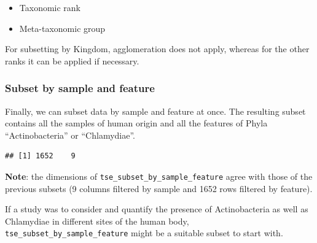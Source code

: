 \documentclass[
]{book}
\newenvironment{Shaded}{\begin{snugshade}}{\end{snugshade}}
\newcommand{\CommentTok}[1]{\textcolor[rgb]{0.56,0.35,0.01}{\textit{#1}}}
\newcommand{\FunctionTok}[1]{\textcolor[rgb]{0.00,0.00,0.00}{#1}}
\newcommand{\NormalTok}[1]{#1}
\newcommand{\OtherTok}[1]{\textcolor[rgb]{0.56,0.35,0.01}{#1}}
\newcommand{\SpecialCharTok}[1]{\textcolor[rgb]{0.00,0.00,0.00}{#1}}
\newcommand{\StringTok}[1]{\textcolor[rgb]{0.31,0.60,0.02}{#1}}
\providecommand{\tightlist}{%
  \setlength{\itemsep}{0pt}\setlength{\parskip}{0pt}}
\begin{document}
\begin{itemize}
\tightlist
\item
  Taxonomic rank
\item
  Meta-taxonomic group
\end{itemize}

For subsetting by Kingdom, agglomeration does not apply, whereas for
the other ranks it can be applied if necessary.

\hypertarget{subset-by-sample-and-feature}{%
\subsubsection{Subset by sample and feature}\label{subset-by-sample-and-feature}}

Finally, we can subset data by sample and feature at once. The
resulting subset contains all the samples of human origin and all the
features of Phyla ``Actinobacteria'' or ``Chlamydiae''.

\begin{Shaded}
\end{Shaded}

\begin{verbatim}
## [1] 1652    9
\end{verbatim}

\textbf{Note}: the dimensions of \texttt{tse\_subset\_by\_sample\_feature} agree with
those of the previous subsets (9 columns filtered by sample and 1652
rows filtered by feature).

If a study was to consider and quantify the presence of Actinobacteria
as well as Chlamydiae in different sites of the human body,
\texttt{tse\_subset\_by\_sample\_feature} might be a suitable subset to start
with.
\end{document}
